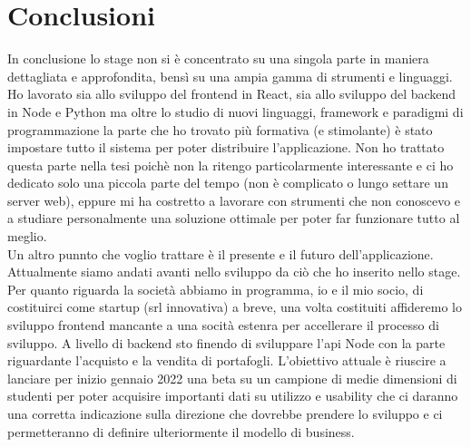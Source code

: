 \chapter{Conclusioni}
In conclusione lo stage non si è concentrato su una singola parte in maniera dettagliata e approfondita, bensì su una ampia gamma di strumenti e linguaggi.\\
Ho lavorato sia allo sviluppo del frontend in React, sia allo sviluppo del backend in Node e Python ma oltre lo studio di nuovi linguaggi, framework e paradigmi di programmazione la parte che ho trovato più formativa (e stimolante) è stato impostare tutto il sistema per poter distribuire l'applicazione. Non ho trattato questa parte nella tesi poichè non la ritengo particolarmente interessante e ci ho dedicato solo una piccola parte del tempo (non è complicato o lungo settare un server web), eppure mi ha costretto a lavorare con strumenti che non conoscevo e a studiare personalmente una soluzione ottimale per poter far funzionare tutto al meglio.\\

\noindent
Un altro punnto che voglio trattare è il presente e il futuro dell'applicazione. Attualmente siamo andati avanti nello sviluppo da ciò che ho inserito nello stage. Per quanto riguarda la società abbiamo in programma, io e il mio socio, di costituirci come startup (srl innovativa) a breve, una volta costituiti affideremo lo sviluppo frontend mancante a una socità estenra per accellerare il processo di sviluppo. A livello di backend sto finendo di sviluppare l'api Node con la parte riguardante l'acquisto e la vendita di portafogli. L'obiettivo attuale è riuscire a lanciare per inizio gennaio 2022 una beta su un campione di medie dimensioni di studenti per poter acquisire importanti dati su utilizzo e usability che ci daranno una corretta indicazione sulla direzione che dovrebbe prendere lo sviluppo e ci permetteranno di definire ulteriormente il modello di business. 

